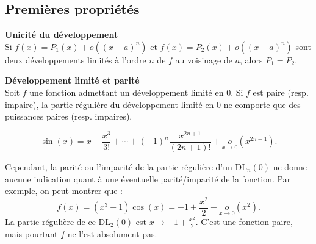 
\subsection{Premières propriétés}

\begin{Prop} \textbf{Unicité du développement}\\
Si $f(x) = P_1(x) + o((x - a)^n)$ et $f(x) = P_2(x) + o((x - a)^n)$ sont deux développements limités à l’ordre $n$ de $f$ au voisinage de $a$, alors $P_1 = P_2$.
\end{Prop}
\begin{Cplt}   \textbf{ Développement limité et parité}\\
Soit $f$ une fonction admettant un développement limité en $0$. Si $f$ est paire (resp. impaire), la partie régulière du développement limité en $0$ ne comporte que des puissances paires (resp. impaires).\\
\end{Cplt} 


\begin{Ex}
\[
\sin(x) = x - \frac{x^3}{3!} + \cdots + (-1)^n \frac{x^{2n+1}}{(2n+1)!} + \underset{x \to 0}{o}(x^{2n+1}).
\]
\end{Ex}

\begin{Rem}


Cependant, la parité ou l’imparité de la partie régulière d’un DL$_n(0)$ ne donne aucune indication quant à une éventuelle parité/imparité de la fonction. Par exemple, on peut montrer que :
\[ f(x) = (x^3 - 1) \cos(x) = -1 + \frac{x^2}{2} +\underset{x \to 0}{o}(x^2). \]
La partie régulière de ce DL$_2(0)$ est $x \mapsto -1 + \frac{x^2}{2}$. C’est une fonction paire, mais pourtant $f$ ne l’est absolument pas.\\
\end{Rem}


